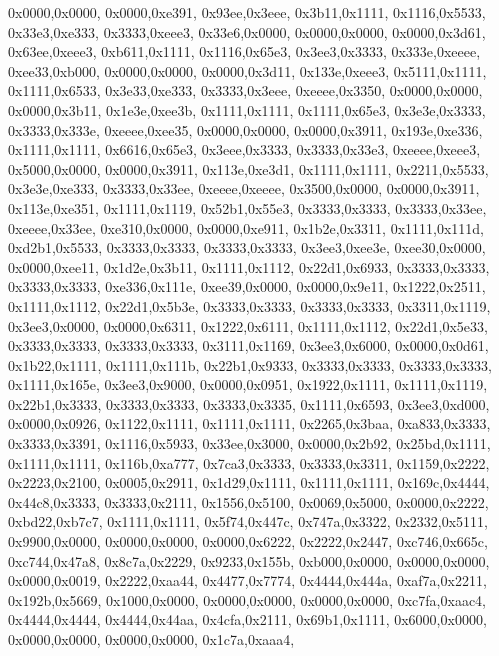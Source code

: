 {	0x0000,0x0000,
	0x0000,0xe391,
	0x93ee,0x3eee,
	0x3b11,0x1111,
	0x1116,0x5533,
	0x33e3,0xe333,
	0x3333,0xeee3,
	0x33e6,0x0000,
	0x0000,0x0000,
	0x0000,0x3d61,
	0x63ee,0xeee3,
	0xb611,0x1111,
	0x1116,0x65e3,
	0x3ee3,0x3333,
	0x333e,0xeeee,
	0xee33,0xb000,
	0x0000,0x0000,
	0x0000,0x3d11,
	0x133e,0xeee3,
	0x5111,0x1111,
	0x1111,0x6533,
	0x3e33,0xe333,
	0x3333,0x3eee,
	0xeeee,0x3350,
	0x0000,0x0000,
	0x0000,0x3b11,
	0x1e3e,0xee3b,
	0x1111,0x1111,
	0x1111,0x65e3,
	0x3e3e,0x3333,
	0x3333,0x333e,
	0xeeee,0xee35,
	0x0000,0x0000,
	0x0000,0x3911,
	0x193e,0xe336,
	0x1111,0x1111,
	0x6616,0x65e3,
	0x3eee,0x3333,
	0x3333,0x33e3,
	0xeeee,0xeee3,
	0x5000,0x0000,
	0x0000,0x3911,
	0x113e,0xe3d1,
	0x1111,0x1111,
	0x2211,0x5533,
	0x3e3e,0xe333,
	0x3333,0x33ee,
	0xeeee,0xeeee,
	0x3500,0x0000,
	0x0000,0x3911,
	0x113e,0xe351,
	0x1111,0x1119,
	0x52b1,0x55e3,
	0x3333,0x3333,
	0x3333,0x33ee,
	0xeeee,0x33ee,
	0xe310,0x0000,
	0x0000,0xe911,
	0x1b2e,0x3311,
	0x1111,0x111d,
	0xd2b1,0x5533,
	0x3333,0x3333,
	0x3333,0x3333,
	0x3ee3,0xee3e,
	0xee30,0x0000,
	0x0000,0xee11,
	0x1d2e,0x3b11,
	0x1111,0x1112,
	0x22d1,0x6933,
	0x3333,0x3333,
	0x3333,0x3333,
	0xe336,0x111e,
	0xee39,0x0000,
	0x0000,0x9e11,
	0x1222,0x2511,
	0x1111,0x1112,
	0x22d1,0x5b3e,
	0x3333,0x3333,
	0x3333,0x3333,
	0x3311,0x1119,
	0x3ee3,0x0000,
	0x0000,0x6311,
	0x1222,0x6111,
	0x1111,0x1112,
	0x22d1,0x5e33,
	0x3333,0x3333,
	0x3333,0x3333,
	0x3111,0x1169,
	0x3ee3,0x6000,
	0x0000,0x0d61,
	0x1b22,0x1111,
	0x1111,0x111b,
	0x22b1,0x9333,
	0x3333,0x3333,
	0x3333,0x3333,
	0x1111,0x165e,
	0x3ee3,0x9000,
	0x0000,0x0951,
	0x1922,0x1111,
	0x1111,0x1119,
	0x22b1,0x3333,
	0x3333,0x3333,
	0x3333,0x3335,
	0x1111,0x6593,
	0x3ee3,0xd000,
	0x0000,0x0926,
	0x1122,0x1111,
	0x1111,0x1111,
	0x2265,0x3baa,
	0xa833,0x3333,
	0x3333,0x3391,
	0x1116,0x5933,
	0x33ee,0x3000,
	0x0000,0x2b92,
	0x25bd,0x1111,
	0x1111,0x1111,
	0x116b,0xa777,
	0x7ca3,0x3333,
	0x3333,0x3311,
	0x1159,0x2222,
	0x2223,0x2100,
	0x0005,0x2911,
	0x1d29,0x1111,
	0x1111,0x1111,
	0x169c,0x4444,
	0x44c8,0x3333,
	0x3333,0x2111,
	0x1556,0x5100,
	0x0069,0x5000,
	0x0000,0x2222,
	0xbd22,0xb7c7,
	0x1111,0x1111,
	0x5f74,0x447c,
	0x747a,0x3322,
	0x2332,0x5111,
	0x9900,0x0000,
	0x0000,0x0000,
	0x0000,0x6222,
	0x2222,0x2447,
	0xc746,0x665c,
	0xc744,0x47a8,
	0x8c7a,0x2229,
	0x9233,0x155b,
	0xb000,0x0000,
	0x0000,0x0000,
	0x0000,0x0019,
	0x2222,0xaa44,
	0x4477,0x7774,
	0x4444,0x444a,
	0xaf7a,0x2211,
	0x192b,0x5669,
	0x1000,0x0000,
	0x0000,0x0000,
	0x0000,0x0000,
	0xc7fa,0xaac4,
	0x4444,0x4444,
	0x4444,0x44aa,
	0x4cfa,0x2111,
	0x69b1,0x1111,
	0x6000,0x0000,
	0x0000,0x0000,
	0x0000,0x0000,
	0x1c7a,0xaaa4,
}
